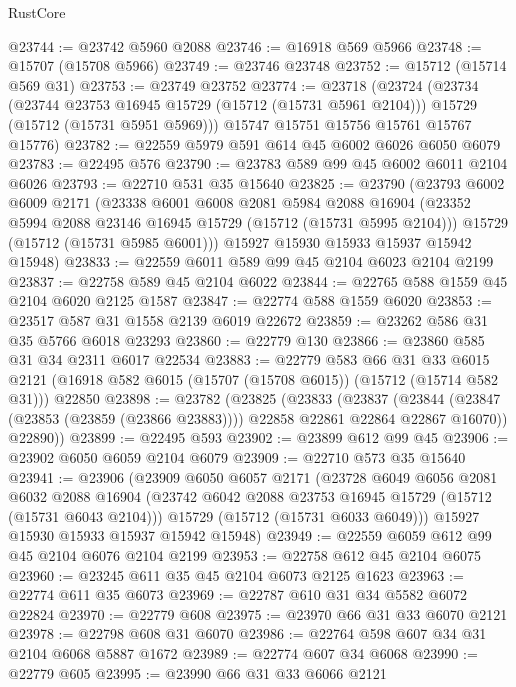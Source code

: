 \begin{lexlean}{RustCore}
\begin{coremodule}
@23744 := @23742 @5960 @2088
@23746 := @16918 @569 @5966
@23748 := @15707 (@15708 @5966)
@23749 := @23746 @23748
@23752 := @15712 (@15714 @569 @31)
@23753 := @23749 @23752
@23774 := @23718
    (@23724
      (@23734
        (@23744 @23753 @16945 @15729 (@15712 (@15731 @5961 @2104)))
        @15729
        (@15712 (@15731 @5951 @5969)))
      @15747
      @15751
      @15756
      @15761
      @15767
      @15776)
@23782 := @22559 @5979 @591 @614 @45 @6002 @6026 @6050 @6079
@23783 := @22495 @576
@23790 := @23783 @589 @99 @45 @6002 @6011 @2104 @6026
@23793 := @22710 @531 @35 @15640
@23825 := @23790
    (@23793
      @6002
      @6009
      @2171
      (@23338
        @6001
        @6008
        @2081
        @5984
        @2088
        @16904
        (@23352 @5994 @2088 @23146 @16945 @15729 (@15712 (@15731 @5995 @2104)))
        @15729
        (@15712 (@15731 @5985 @6001)))
      @15927
      @15930
      @15933
      @15937
      @15942
      @15948)
@23833 := @22559 @6011 @589 @99 @45 @2104 @6023 @2104 @2199
@23837 := @22758 @589 @45 @2104 @6022
@23844 := @22765 @588 @1559 @45 @2104 @6020 @2125 @1587
@23847 := @22774 @588 @1559 @6020
@23853 := @23517 @587 @31 @1558 @2139 @6019 @22672
@23859 := @23262 @586 @31 @35 @5766 @6018 @23293
@23860 := @22779 @130
@23866 := @23860 @585 @31 @34 @2311 @6017 @22534
@23883 := @22779
    @583
    @66
    @31
    @33
    @6015
    @2121
    (@16918 @582 @6015 (@15707 (@15708 @6015)) (@15712 (@15714 @582 @31)))
    @22850
@23898 := @23782
    (@23825
      (@23833
        (@23837
          (@23844 (@23847 (@23853 (@23859 (@23866 @23883)))) @22858 @22861 @22864 @22867 @16070))
        @22890))
@23899 := @22495 @593
@23902 := @23899 @612 @99 @45
@23906 := @23902 @6050 @6059 @2104 @6079
@23909 := @22710 @573 @35 @15640
@23941 := @23906
    (@23909
      @6050
      @6057
      @2171
      (@23728
        @6049
        @6056
        @2081
        @6032
        @2088
        @16904
        (@23742 @6042 @2088 @23753 @16945 @15729 (@15712 (@15731 @6043 @2104)))
        @15729
        (@15712 (@15731 @6033 @6049)))
      @15927
      @15930
      @15933
      @15937
      @15942
      @15948)
@23949 := @22559 @6059 @612 @99 @45 @2104 @6076 @2104 @2199
@23953 := @22758 @612 @45 @2104 @6075
@23960 := @23245 @611 @35 @45 @2104 @6073 @2125 @1623
@23963 := @22774 @611 @35 @6073
@23969 := @22787 @610 @31 @34 @5582 @6072 @22824
@23970 := @22779 @608
@23975 := @23970 @66 @31 @33 @6070 @2121
@23978 := @22798 @608 @31 @6070
@23986 := @22764 @598 @607 @34 @31 @2104 @6068 @5887 @1672
@23989 := @22774 @607 @34 @6068
@23990 := @22779 @605
@23995 := @23990 @66 @31 @33 @6066 @2121

\end{coremodule}
\end{lexlean}
